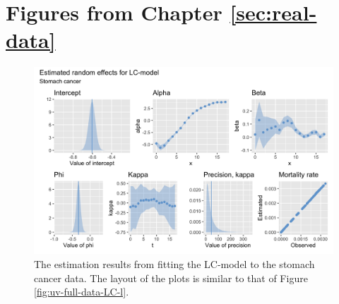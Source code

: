 \setcounter{table}{0}
\renewcommand{\thetable}{A\arabic{table}}
\setcounter{figure}{0}
\renewcommand{\thefigure}{A\arabic{figure}}

\section{Figures from Chapter \ref{sec:real-data}}

\begin{figure}[h!]
    \centering
    \includegraphics[width=0.85\linewidth]{real-data/real-data-univariate/Figures/uv-full-data-lc-s.png}
    \caption{The estimation results from fitting the LC-model to the stomach cancer data. The layout of the plots is similar to that of Figure \ref{fig:uv-full-data-LC-l}.}
    \label{fig:uv-full-data-LC-s}
\end{figure}

